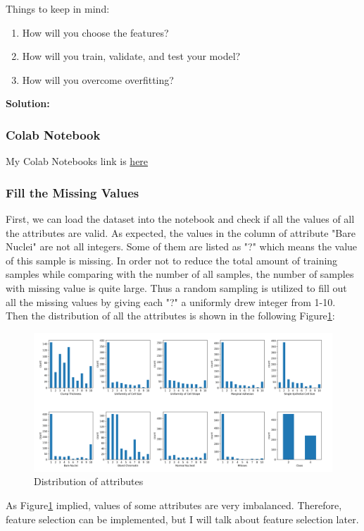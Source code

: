 \documentclass[a4paper]{article}
\begin{document}
Things to keep in mind: 
\begin{enumerate}
    \item How will you choose the features? 
    \item How will you train, validate, and test your model?
    \item How will you overcome overfitting?
\end{enumerate}
\textbf{Solution:}
\subsubsection*{Colab Notebook}
My Colab Notebooks link is \href{https://colab.research.google.com/drive/1pgkRWooWQiUSFWXuV75HSUtzRIowMycu?usp=sharing}{here}
\subsubsection*{Fill the Missing Values}
First, we can load the dataset into the notebook and check if all the values of all the attributes are valid. As expected, the values in the column of attribute "Bare Nuclei" are not all integers. Some of them are listed as "?" which means the value of this sample is missing. In order not to reduce the total amount of training samples while comparing with the number of all samples, the number of samples with missing value is quite large. Thus a random sampling is utilized to fill out all the missing values by giving each "?" a uniformly drew integer from 1-10. Then the distribution of all the attributes is shown in the following Figure\ref{1}:
\begin{figure}[H]
\centering
\includegraphics[width=1\textwidth]{all_attributes.png}
\caption{Distribution of attributes}
\label{1}
\end{figure}

As Figure\ref{1} implied, values of some attributes are very imbalanced. Therefore, feature selection can be implemented, but I will talk about feature selection later.
\end{document}
